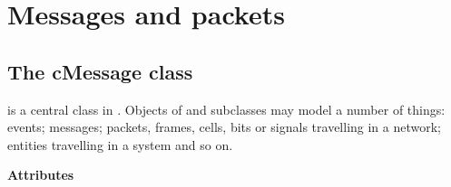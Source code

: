 \section{Messages and packets}

\subsection{The cMessage class}

 is a central class in {\opp}. Objects of  and
subclasses may model a number of things: events;
messages; packets,
frames, cells, bits or signals travelling
in a network; entities travelling in a system and so on.


\textbf{Attributes}


